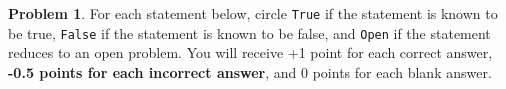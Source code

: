 \documentclass[10pt]{exam}
\newcommand*{\hl}[1]{\colorbox{yellow}{#1}}
\newcommand*{\TrueFalse}[1]{%
\ifprintanswers
    \ifthenelse{\equal{#1}{T}}{%
        \hl{\texttt{True}}\hspace*{20pt}\texttt{False}\hspace*{20pt}\texttt{Open}
    }{
        \ifthenelse{\equal{#1}{F}}{
        \texttt{True}\hspace*{20pt}\hl{\texttt{False}}\hspace*{20pt}\texttt{Open}
        }
        {
            \texttt{True}\hspace*{20pt}{\texttt{False}}\hspace*{20pt}\hl{\texttt{Open}}
        }
    }
\else
    \texttt{True}\hspace*{20pt}\texttt{False}\hspace*{20pt}\texttt{Open}
\fi
}
\newlength\TFlengthA
\newlength\TFlengthB
\newcommand\TFQuestion[2]{%
    \setlength\TFlengthB{\linewidth}
    \addtolength\TFlengthB{-\TFlengthA}
    \noindent
    \parbox[t]{\TFlengthA}{\TrueFalse{#1}}\parbox[t]{\TFlengthB}{#2}
    \vspace{0.25in}
}
\theoremstyle{definition}
\newtheorem{problem}{Problem}
\newcommand{\Ein}{E_{\text{in}}}
\newcommand{\Eout}{E_{\text{out}}}
\begin{document}
\begin{problem}
    For each statement below,
    circle \texttt{True} if the statement is known to be true,
    \texttt{False} if the statement is known to be false,
    and \texttt{Open} if the statement reduces to an open problem.
    You will receive +1 point for each correct answer,
    \textbf{-0.5 points for each incorrect answer},%
    and 0 points for each blank answer.


\begin{enumerate}

%
%




\end{enumerate}
\end{problem}
\end{document}
